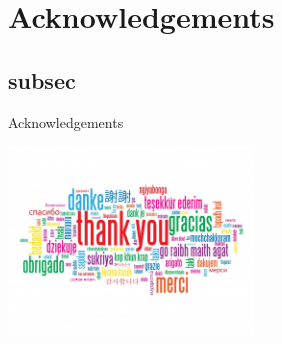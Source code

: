 \section*{Acknowledgements}
\subsection{subsec}
\begin{frame}{Acknowledgements}

    \begin{minipage}[c]{0.25\textwidth}
        \begin{center}
            \includegraphics[width=6.5cm]{./immagini/thanks}
        \end{center}
    \end{minipage}

\end{frame}